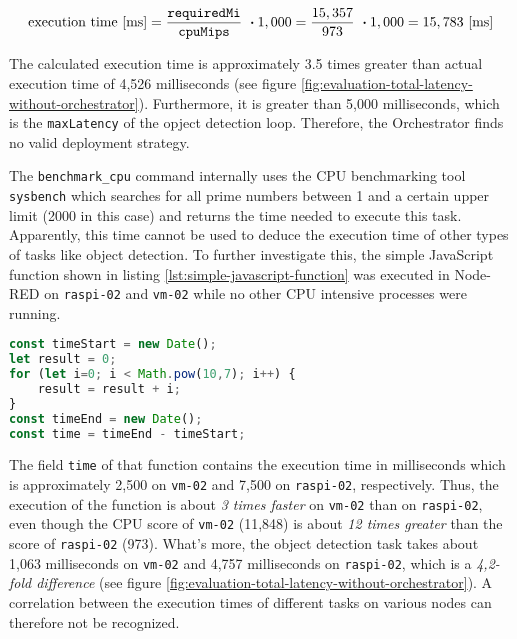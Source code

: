 \[\textrm{execution time [ms]} = \frac{\textrm{\texttt{requiredMi}}}{\textrm{\texttt{cpuMips}}}\ \boldsymbol{\cdot} 1,000 = \frac{15,357}{973}\ \boldsymbol{\cdot} 1,000 = 15,783 \textrm{ [ms]}\]

The calculated execution time is approximately 3.5 times greater than actual execution time of 4,526 milliseconds (see figure \ref{fig:evaluation-total-latency-without-orchestrator}).
Furthermore, it is greater than 5,000 milliseconds, which is the \texttt{maxLatency} of the opject detection loop. 
Therefore, the Orchestrator finds no valid deployment strategy.

The \texttt{benchmark\_cpu} command internally uses the CPU benchmarking tool \texttt{sysbench} which searches for all prime numbers between 1 and a certain upper limit (2000 in this case) and returns the time needed to execute this task.
Apparently, this time cannot be used to deduce the execution time of other types of tasks like object detection.
To further investigate this, the simple JavaScript function shown in listing \ref{lst:simple-javascript-function} was executed in Node-RED on \texttt{raspi-02} and \texttt{vm-02} while no other CPU intensive processes were running.

\begin{lstlisting}[language=JavaScript,numbers=none,caption={JavaScript function which executes simple mathematical tasks while measuring the total execution time},label=lst:simple-javascript-function]
const timeStart = new Date();
let result = 0;
for (let i=0; i < Math.pow(10,7); i++) {
    result = result + i;
}
const timeEnd = new Date();
const time = timeEnd - timeStart;
\end{lstlisting}

The field \texttt{time} of that function contains the execution time in milliseconds which is approximately 2,500 on \texttt{vm-02} and 7,500 on \texttt{raspi-02}, respectively. 
Thus, the execution of the function is about \textit{3 times faster} on \texttt{vm-02} than on \texttt{raspi-02}, even though the CPU score of \texttt{vm-02} (11,848) is about \textit{12 times greater} than the score of \texttt{raspi-02} (973).
What's more, the object detection task takes about 1,063 milliseconds on \texttt{vm-02} and 4,757 milliseconds on \texttt{raspi-02}, which is a \textit{4,2-fold difference} (see figure \ref{fig:evaluation-total-latency-without-orchestrator}). A correlation between the execution times of different tasks on various nodes can therefore not be recognized.

